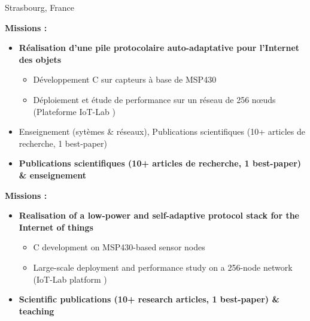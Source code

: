 {}{}{Strasbourg, France}{
\ifnativelang
	\textcolor{color1}{\textbf{Missions :}}
	\begin{itemize}[leftmargin=\ListItemsMargins]
		\item \textbf{R\'ealisation d'une pile protocolaire auto-adaptative pour l'Internet des objets}
		\begin{itemize}
			\item D\'eveloppement C sur capteurs \`a base de MSP430
			\item D\'eploiement et étude de performance sur un r\'eseau de 256 n\oe uds (Plateforme IoT-Lab \textcolor{color1}{\href{https://www.iot-lab.info/}{\ExternalLink}})
		\end{itemize}
		\item Enseignement (syt\`emes \& r\'eseaux), Publications scientifiques (10+ articles de recherche, 1 best-paper)
		\ifaddmngt
		\item \textbf{Publications scientifiques (10+ articles de recherche, 1 best-paper) \& enseignement}
		\fi
	\end{itemize}
\else
	\textcolor{color1}{\textbf{Missions :}}
	\begin{itemize}[leftmargin=\ListItemsMargins]
		\item \textbf{Realisation of a low-power and self-adaptive protocol stack for the Internet of things}
		\begin{itemize}
			\item C development on MSP430-based sensor nodes
			\item Large-scale deployment and performance study on a 256-node network  (IoT-Lab platform \textcolor{color1}{\href{https://www.iot-lab.info/}{\ExternalLink}})
		\end{itemize}
		\ifaddmngt
		\item \textbf{Scientific publications (10+ research articles, 1 best-paper) \& teaching}
		\fi
	\end{itemize}
\fi
}


